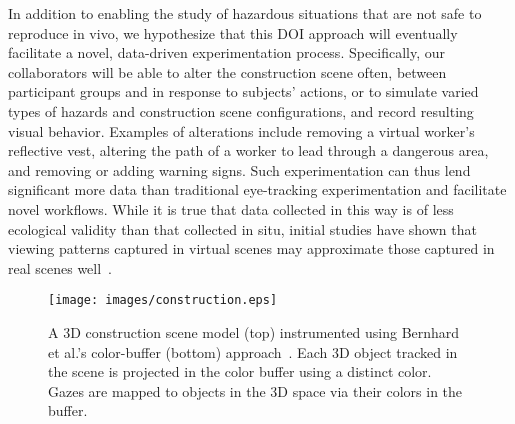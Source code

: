 In addition to enabling the study of hazardous situations that are not safe to reproduce in vivo, we hypothesize that this DOI approach will eventually facilitate a novel, data-driven experimentation process. Specifically, our collaborators will be able to alter the construction scene often, between participant groups and in response to subjects' actions, or to simulate varied types of hazards and construction scene configurations, and record resulting visual behavior. Examples of alterations include removing a virtual worker's reflective vest, altering the path of a worker to lead through a dangerous area, and removing or adding warning signs. Such experimentation can thus lend significant more data than traditional eye-tracking experimentation and facilitate novel workflows. While it is true that data collected in this way is of less ecological validity than that collected in situ, initial studies have shown that viewing patterns captured in virtual scenes may approximate those captured in real scenes well~\cite{nipesh}.

\begin{figure}[htbp]
  \centering
  \texttt{[image: images/construction.eps]}
  \caption{A 3D construction scene model (top) instrumented using Bernhard et al.'s color-buffer (bottom) approach~\cite{Bern14}. Each 3D object tracked in the scene is projected in the color buffer using a distinct color. Gazes are mapped to objects in the 3D space via their colors in the buffer.}
	\label{fig:construction}
\end{figure}